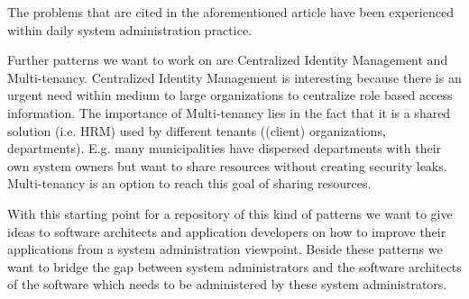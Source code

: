The problems that are cited in the aforementioned article have been experienced within daily system administration practice. 

Further patterns we want to work on are {\sc Centralized Identity Management} and {\sc Multi-tenancy}. {\sc Centralized Identity Management} is interesting because there is an urgent need within medium to large organizations to centralize role based access information. The importance of {\sc Multi-tenancy} lies in the fact that it is a shared solution (i.e. HRM) used by different tenants ((client) organizations, departments). E.g. many municipalities have dispersed departments with their own system owners but want to share resources without creating security leaks. Multi-tenancy is an option to reach this goal of sharing resources.

With this starting point for a repository of this kind of patterns we want to give ideas to software architects and application developers on how to improve their applications from a system administration viewpoint. Beside these patterns we want to bridge the gap between system administrators and the software architects of the software which needs to be administered by these system administrators.
